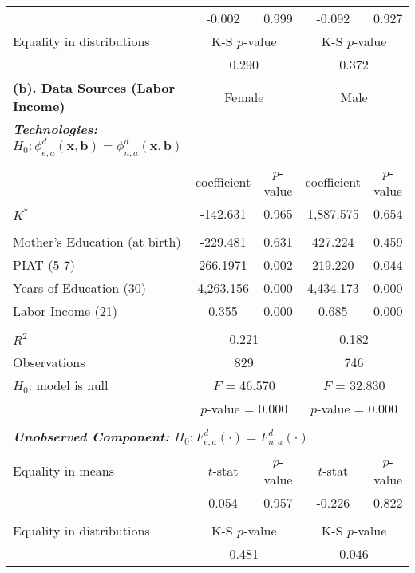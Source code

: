 \begin{table}[!htpb]
\begin{threeparttable}
\begin{tabular}{lcccc}
 & -0.002  & 0.999 & -0.092 & 0.927   \\ 
Equality in distributions & \multicolumn{2}{c}{K-S $p$-value} &  \multicolumn{2}{c}{K-S $p$-value}  \\ 
                                      & \multicolumn{2}{c}{0.290} &  \multicolumn{2}{c}{0.372}  \\ \midrule 
 \multicolumn{1}{l}{\textbf{(b). Data Sources (Labor Income)}} & \multicolumn{2}{c}{Female} &   \multicolumn{2}{c}{Male} \\
 \textbf{\textit{Technologies:} $H_0: \phi_{e,a}^d \left( \bm{x}, \bm{b} \right) = \phi_{n,a}^d \left( \bm{x}, \bm{b} \right)$}      \\
       			      & coefficient & $p$-value & coefficient & $p$-value \\
$K^*$ & -142.631 & 0.965 & 1,887.575 & 0.654 \\ \\
Mother's Education (at birth) & -229.481 & 0.631 & 427.224 & 0.459 \\
PIAT (5-7) & 266.1971 & 0.002 & 219.220 & 0.044 \\
Years of Education (30) & 4,263.156 & 0.000 & 4,434.173 & 0.000 \\
Labor Income (21) & 0.355 & 0.000 & 0.685 & 0.000 \\ \\
$R^2$ & \multicolumn{2}{c}{0.221}  & \multicolumn{2}{c}{0.182}  \\
Observations & \multicolumn{2}{c}{829} & \multicolumn{2}{c}{746} \\ 
$H_0$: model is null & \multicolumn{2}{c}{$F$ = 46.570} & \multicolumn{2}{c}{$F$ = 32.830} \\
& \multicolumn{2}{c}{$p$-value = 0.000} & \multicolumn{2}{c}{$p$-value = 0.000} \\ \\
 \multicolumn{5}{l}{\textbf{\textit{Unobserved Component:} $H_0:  F_{e,a}^d \left( \cdot \right) =  F_{n,a}^d \left( \cdot \right)$}} \\  
Equality in means & $t$-stat & $p$-value & $t$-stat & $p$-value \\
 & 0.054  & 0.957 & -0.226 & 0.822   \\ \\
Equality in distributions & \multicolumn{2}{c}{K-S $p$-value} &  \multicolumn{2}{c}{K-S $p$-value}  \\ 
                                      & \multicolumn{2}{c}{0.481} &  \multicolumn{2}{c}{0.046}  \\ \bottomrule

\end{tabular}
\end{threeparttable}
\end{table}
